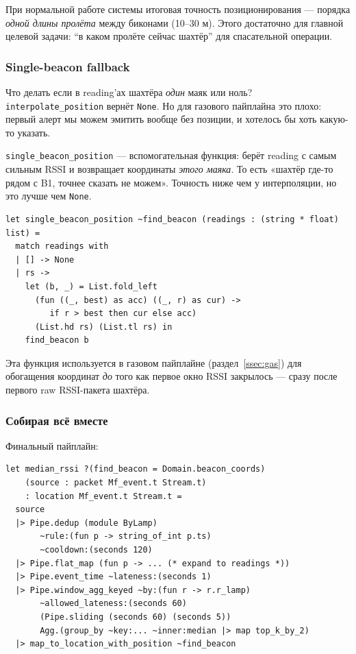 При нормальной работе системы итоговая точность позиционирования ---
порядка \emph{одной длины пролёта} между биконами (10--30 м). Этого
достаточно для главной целевой задачи: ``в каком пролёте сейчас
шахтёр'' для спасательной операции.

\subsubsection{Single-beacon fallback}

Что делать если в reading'ах шахтёра \emph{один} маяк или ноль?
\texttt{interpolate\_position} вернёт \texttt{None}. Но для
газового пайплайна это плохо: первый алерт мы можем эмитить вообще
без позиции, и хотелось бы хоть какую-то указать.

\texttt{single\_beacon\_position} --- вспомогательная функция:
берёт reading с самым сильным RSSI и возвращает координаты
\emph{этого маяка}. То есть «шахтёр где-то рядом с B1, точнее
сказать не можем». Точность ниже чем у интерполяции, но это лучше
чем \texttt{None}.

\begin{lstlisting}
let single_beacon_position ~find_beacon (readings : (string * float) list) =
  match readings with
  | [] -> None
  | rs ->
    let (b, _) = List.fold_left
      (fun ((_, best) as acc) ((_, r) as cur) ->
         if r > best then cur else acc)
      (List.hd rs) (List.tl rs) in
    find_beacon b
\end{lstlisting}

Эта функция используется в газовом пайплайне (раздел~\ref{ssec:gas})
для обогащения координат \emph{до} того как первое окно RSSI
закрылось --- сразу после первого raw RSSI-пакета шахтёра.

\subsubsection{Собирая всё вместе}

Финальный пайплайн:

\begin{lstlisting}
let median_rssi ?(find_beacon = Domain.beacon_coords)
    (source : packet Mf_event.t Stream.t)
    : location Mf_event.t Stream.t =
  source
  |> Pipe.dedup (module ByLamp)
       ~rule:(fun p -> string_of_int p.ts)
       ~cooldown:(seconds 120)
  |> Pipe.flat_map (fun p -> ... (* expand to readings *))
  |> Pipe.event_time ~lateness:(seconds 1)
  |> Pipe.window_agg_keyed ~by:(fun r -> r.r_lamp)
       ~allowed_lateness:(seconds 60)
       (Pipe.sliding (seconds 60) (seconds 5))
       Agg.(group_by ~key:... ~inner:median |> map top_k_by_2)
  |> map_to_location_with_position ~find_beacon
\end{lstlisting}

